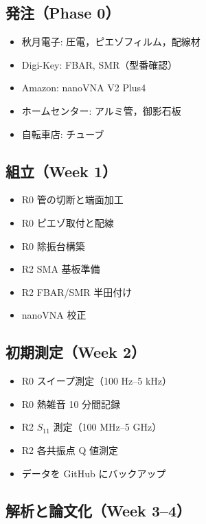 \documentclass[11pt,a4paper]{article}
\begin{document}
\subsection{発注（Phase 0）}

\begin{itemize}
\item[$\square$] 秋月電子: 圧電，ピエゾフィルム，配線材
\item[$\square$] Digi-Key: FBAR, SMR（型番確認）
\item[$\square$] Amazon: nanoVNA V2 Plus4
\item[$\square$] ホームセンター: アルミ管，御影石板
\item[$\square$] 自転車店: チューブ
\end{itemize}

\subsection{組立（Week 1）}

\begin{itemize}
\item[$\square$] R0 管の切断と端面加工
\item[$\square$] R0 ピエゾ取付と配線
\item[$\square$] R0 除振台構築
\item[$\square$] R2 SMA 基板準備
\item[$\square$] R2 FBAR/SMR 半田付け
\item[$\square$] nanoVNA 校正
\end{itemize}

\subsection{初期測定（Week 2）}

\begin{itemize}
\item[$\square$] R0 スイープ測定（100 Hz--5 kHz）
\item[$\square$] R0 熱雑音 10 分間記録
\item[$\square$] R2 $S_{11}$ 測定（100 MHz--5 GHz）
\item[$\square$] R2 各共振点 Q 値測定
\item[$\square$] データを GitHub にバックアップ
\end{itemize}

\subsection{解析と論文化（Week 3--4）}
\end{document}

